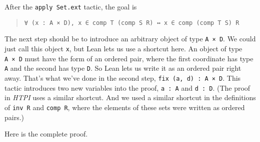 \documentclass[
  letterpaper,
  DIV=11,
  numbers=noendperiod]{scrreprt}
\theoremstyle{remark}
\begin{document}
After the \texttt{apply\ Set.ext} tactic, the goal is

\begin{quote}
\texttt{∀\ (x\ :\ A\ ×\ D),\ x\ ∈\ comp\ T\ (comp\ S\ R)\ ↔\ x\ ∈\ comp\ (comp\ T\ S)\ R}

\end{quote}

The next step should be to introduce an arbitrary object of type
\texttt{A\ ×\ D}. We could just call this object \texttt{x}, but Lean
lets us use a shortcut here. An object of type \texttt{A\ ×\ D} must
have the form of an ordered pair, where the first coordinate has type
\texttt{A} and the second has type \texttt{D}. So Lean lets us write it
as an ordered pair right away. That's what we've done in the second
step, \texttt{fix\ (a,\ d)\ :\ A\ ×\ D}. This tactic introduces two new
variables into the proof, \texttt{a\ :\ A} and \texttt{d\ :\ D}. (The
proof in \emph{HTPI} uses a similar shortcut. And we used a similar
shortcut in the definitions of \texttt{inv\ R} and \texttt{comp\ R},
where the elements of these sets were written as ordered pairs.)

Here is the complete proof.
\end{document}
